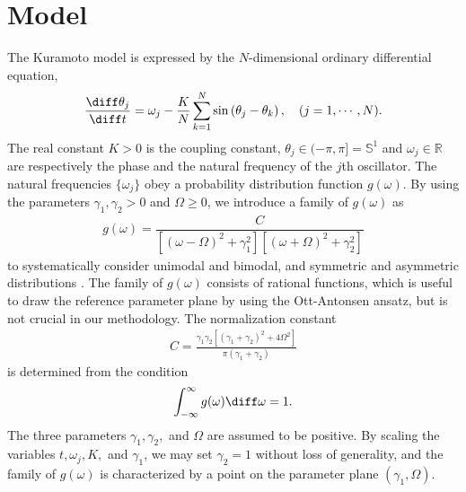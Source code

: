 \section{Model}
\label{sec:model}
The Kuramoto model is
expressed by the $N$-dimensional ordinary differential equation,
\begin{align}
  \frac{\diff\theta_{j}}{\diff t}
  = \omega_{j} - \frac{K}{N}\sum_{k=1}^{N}\sin\left(\theta_{j}-\theta_{k}\right),
  \quad
  (j=1,\cdots,N).
  \label{eq:kuramoto}
\end{align}
The real constant $K>0$ is the coupling constant,
$\theta_{j}\in (-\pi,\pi]=\mathbb{S}^{1}$ and $\omega_{j}\in\mathbb{R}$
are respectively the phase and the natural frequency of the $j$th oscillator.
The natural frequencies $\{\omega_{j}\}$ obey
a probability distribution function $g(\omega)$.
  By using the parameters $\gamma_{1},\gamma_{2}>0$ and $\Omega\geq 0$,
we introduce a family of $g(\omega)$ as
\begin{align}
  \label{eq:g}
  g(\omega)
  = \dfrac{C}{[(\omega-\Omega)^{2}+\gamma_{1}^{2}][(\omega+\Omega)^{2}+\gamma_{2}^{2}]}
\end{align}
to systematically consider unimodal and bimodal,
and symmetric and asymmetric distributions \cite{terada2017,terada2018}.
The family of $g(\omega)$ consists of rational functions,
which is useful to draw the reference parameter plane by using 
the Ott-Antonsen ansatz, but is not crucial in our methodology.
The normalization constant
\begin{align}
  C=\frac{\gamma_{1}\gamma_{2}[(\gamma_{1}+\gamma_{2})^2+4\Omega^2]}{\pi(\gamma_{1}+\gamma_{2})}
\end{align}
is determined from the condition
\begin{align}
  \int_{-\infty}^{\infty}g(\omega) \diff\omega = 1.
\end{align}
The three parameters $\gamma_{1},\gamma_{2},$ and $\Omega$
are assumed to be positive.
By scaling the variables $t,\omega_{j},K,$ and $\gamma_{1}$,
we may set $\gamma_{2}=1$ without loss of generality,
and the family of $g(\omega)$ is characterized
by a point on the parameter plane $(\gamma_{1},\Omega)$.
